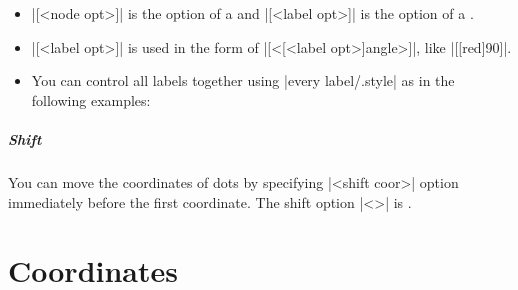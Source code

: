 \remark
\begin{itemize}
\item |[<node opt>]| is the option of a  and |[<label opt>]| is the option of a .
\item |[<label opt>]| is used in the form of |[<[<label opt>]angle>]|, like |[[red]90]|.
\item You can control all labels together using |every label/.style| as in the following examples:
\end{itemize}

\begin{tzcode}{.3}
\end{tzcode}


\begin{tzcode}{.3}
\end{tzcode}


\paragraph{Shift} You can move the coordinates of dots by specifying |<shift coor>| option immediately before the first coordinate.
The  shift option |<>| is .

\begin{tzcode}{.3}
\end{tzcode}



\chapter{Coordinates}
\label{c:coordinates}

